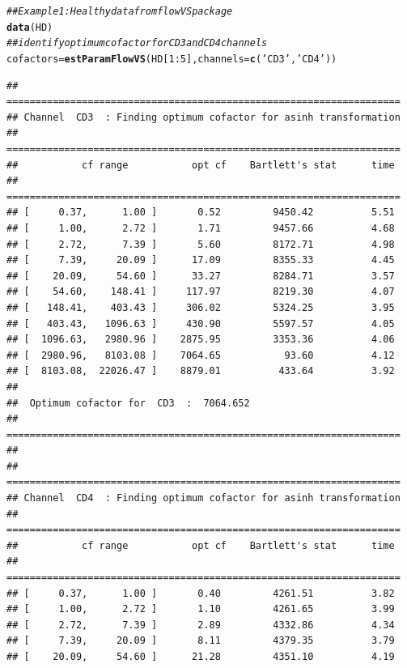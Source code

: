 \documentclass{article}\usepackage[]{graphicx}\usepackage[]{color}
\makeatletter
\newcommand{\hlnum}[1]{\textcolor[rgb]{0.686,0.059,0.569}{#1}}%
\newcommand{\hlstr}[1]{\textcolor[rgb]{0.192,0.494,0.8}{#1}}%
\newcommand{\hlcom}[1]{\textcolor[rgb]{0.678,0.584,0.686}{\textit{#1}}}%
\newcommand{\hlopt}[1]{\textcolor[rgb]{0,0,0}{#1}}%
\newcommand{\hlstd}[1]{\textcolor[rgb]{0.345,0.345,0.345}{#1}}%
\newcommand{\hlkwb}[1]{\textcolor[rgb]{0.69,0.353,0.396}{#1}}%
\newcommand{\hlkwc}[1]{\textcolor[rgb]{0.333,0.667,0.333}{#1}}%
\newcommand{\hlkwd}[1]{\textcolor[rgb]{0.737,0.353,0.396}{\textbf{#1}}}%
\newenvironment{kframe}{%
 \def\at@end@of@kframe{}%
 \ifinner\ifhmode%
  \def\at@end@of@kframe{\end{minipage}}%
  \begin{minipage}{\columnwidth}%
 \fi\fi%
 \def\FrameCommand##1{\hskip\@totalleftmargin \hskip-\fboxsep
 \colorbox{shadecolor}{##1}\hskip-\fboxsep
     \hskip-\linewidth \hskip-\@totalleftmargin \hskip\columnwidth}%
 \MakeFramed {\advance\hsize-\width
   \@totalleftmargin\z@ \linewidth\hsize
   \@setminipage}}%
 {\par\unskip\endMakeFramed%
 \at@end@of@kframe}
\newenvironment{knitrout}{}{} %
\makeatother
\begin{document}
\begin{knitrout}
\color{fgcolor}\begin{kframe}
\begin{alltt}
\hlcom{## Example 1: Healthy data from flowVS package}
\hlkwd{data}\hlstd{(HD)}
\hlcom{## identify optimum cofactor for CD3 and CD4 channels }
\hlstd{cofactors} \hlkwb{=} \hlkwd{estParamFlowVS}\hlstd{(HD[}\hlnum{1}\hlopt{:}\hlnum{5}\hlstd{],}\hlkwc{channels}\hlstd{=}\hlkwd{c}\hlstd{(}\hlstr{'CD3'}\hlstd{,} \hlstr{'CD4'}\hlstd{))}
\end{alltt}
\begin{verbatim}
## ====================================================================
## Channel  CD3  : Finding optimum cofactor for asinh transformation
## ====================================================================
##           cf range           opt cf    Bartlett's stat      time 
## ====================================================================
## [     0.37,      1.00 ]       0.52         9450.42          5.51 
## [     1.00,      2.72 ]       1.71         9457.66          4.68 
## [     2.72,      7.39 ]       5.60         8172.71          4.98 
## [     7.39,     20.09 ]      17.09         8355.33          4.45 
## [    20.09,     54.60 ]      33.27         8284.71          3.57 
## [    54.60,    148.41 ]     117.97         8219.30          4.07 
## [   148.41,    403.43 ]     306.02         5324.25          3.95 
## [   403.43,   1096.63 ]     430.90         5597.57          4.05 
## [  1096.63,   2980.96 ]    2875.95         3353.36          4.06 
## [  2980.96,   8103.08 ]    7064.65           93.60          4.12 
## [  8103.08,  22026.47 ]    8879.01          433.64          3.92
## 
##  Optimum cofactor for  CD3  :  7064.652 
## ====================================================================
## 
## ====================================================================
## Channel  CD4  : Finding optimum cofactor for asinh transformation
## ====================================================================
##           cf range           opt cf    Bartlett's stat      time 
## ====================================================================
## [     0.37,      1.00 ]       0.40         4261.51          3.82 
## [     1.00,      2.72 ]       1.10         4261.65          3.99 
## [     2.72,      7.39 ]       2.89         4332.86          4.34 
## [     7.39,     20.09 ]       8.11         4379.35          3.79 
## [    20.09,     54.60 ]      21.28         4351.10          4.19 

\end{verbatim}
\end{kframe}
\end{knitrout}
\end{document}
